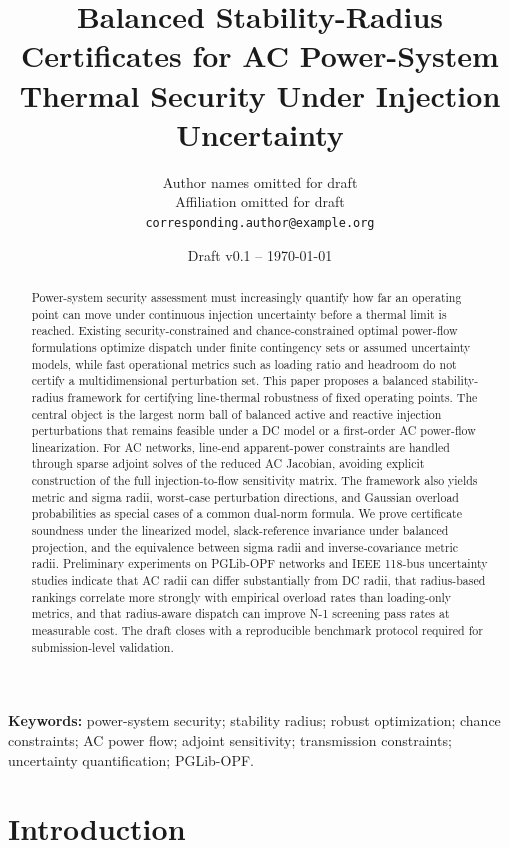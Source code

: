 \documentclass[11pt]{article}
\title{Balanced Stability-Radius Certificates for AC Power-System Thermal Security Under Injection Uncertainty}
\author{
  Author names omitted for draft\\
  Affiliation omitted for draft\\
  \texttt{corresponding.author@example.org}
}
\date{Draft v0.1 -- \today}
\begin{document}
\maketitle

\begin{abstract}
Power-system security assessment must increasingly quantify how far an operating point can move under continuous injection uncertainty before a thermal limit is reached. Existing security-constrained and chance-constrained optimal power-flow formulations optimize dispatch under finite contingency sets or assumed uncertainty models, while fast operational metrics such as loading ratio and headroom do not certify a multidimensional perturbation set. This paper proposes a balanced stability-radius framework for certifying line-thermal robustness of fixed operating points. The central object is the largest norm ball of balanced active and reactive injection perturbations that remains feasible under a DC model or a first-order AC power-flow linearization. For AC networks, line-end apparent-power constraints are handled through sparse adjoint solves of the reduced AC Jacobian, avoiding explicit construction of the full injection-to-flow sensitivity matrix. The framework also yields metric and sigma radii, worst-case perturbation directions, and Gaussian overload probabilities as special cases of a common dual-norm formula. We prove certificate soundness under the linearized model, slack-reference invariance under balanced projection, and the equivalence between sigma radii and inverse-covariance metric radii. Preliminary experiments on PGLib-OPF networks and IEEE 118-bus uncertainty studies indicate that AC radii can differ substantially from DC radii, that radius-based rankings correlate more strongly with empirical overload rates than loading-only metrics, and that radius-aware dispatch can improve N-1 screening pass rates at measurable cost. The draft closes with a reproducible benchmark protocol required for submission-level validation.
\end{abstract}

\noindent\textbf{Keywords:} power-system security; stability radius; robust optimization; chance constraints; AC power flow; adjoint sensitivity; transmission constraints; uncertainty quantification; PGLib-OPF.

\section{Introduction}
\end{document}
